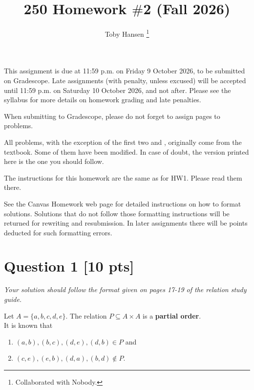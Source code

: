 \documentclass[12pt]{article}
\title{250 Homework $\#$2 (Fall 2026)}
\author{Toby Hansen \footnote{Collaborated with Nobody.}}
\begin{document}
	\date{}
	\maketitle

	This assignment is due at 11:59 p.m. on Friday 9 October 2026, to be submitted
	on Gradescope. Late assignments (with penalty, unless excused) will be
	accepted until 11:59 p.m. on Saturday 10 October 2026, and not after. Please see
	the syllabus for more details on homework grading and late penalties.

	\medskip

	When submitting to Gradescope, please do not forget to assign pages to problems.

	\medskip

	All problems, with the exception of the first two and , originally come from the
	textbook. Some of them have been modified. In case of doubt, the version
	printed here is the one you should follow.

	\bigskip

	The instructions for this homework are the same as for HW1. Please read them
	there.

	\bigskip

	See the Canvas Homework web page for detailed instructions on how to format solutions.
	Solutions that do not follow those formatting instructions will be returned
	for rewriting and resubmission. In later assignments there will be points deducted
	for such formatting errors.

	\newpage

	\section*{\textbf{Question 1} [10 pts]}
	{\em \small Your solution should follow the format given on pages 17-19 of the relation study guide.}

	Let $A =\{a,b,c,d,e\}$. The relation $P \subseteq A \times A$ is a
	{\bf partial order}.\\
	It is known that
	\begin{enumerate}
		\item $(a,b),(b,c),(d,e), (d,b)\in P$ and

		\item $(c,e), (e,b),(d,a),(b,d) \not\in P.$
	\end{enumerate}
\end{document}
